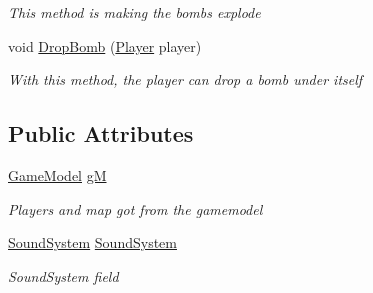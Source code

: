 \begin{DoxyCompactItemize}
\begin{DoxyCompactList}\small\item\em This method is making the bombs explode \end{DoxyCompactList}\item 
void \mbox{\hyperlink{class_bomberman_1_1_business_logic_1_1_game_logic_a111f41e903e34bd84c7acd362fd0c562}{Drop\+Bomb}} (\mbox{\hyperlink{class_bomberman_1_1_model_1_1_player}{Player}} player)
\begin{DoxyCompactList}\small\item\em With this method, the player can drop a bomb under itself \end{DoxyCompactList}\end{DoxyCompactItemize}
\subsection*{Public Attributes}
\begin{DoxyCompactItemize}
\item 
\mbox{\hyperlink{class_bomberman_1_1_business_logic_1_1_game_model}{Game\+Model}} \mbox{\hyperlink{class_bomberman_1_1_business_logic_1_1_game_logic_abde3e754422fcaffa997b571fb9e7010}{gM}}
\begin{DoxyCompactList}\small\item\em Players and map got from the gamemodel \end{DoxyCompactList}\item 
\mbox{\hyperlink{class_bomberman_1_1_business_logic_1_1_logic_classes_1_1_sound_system}{Sound\+System}} \mbox{\hyperlink{class_bomberman_1_1_business_logic_1_1_game_logic_acbbb40696d2e107f2340363c2e12069f}{Sound\+System}}
\begin{DoxyCompactList}\small\item\em Sound\+System field \end{DoxyCompactList}\end{DoxyCompactItemize}
